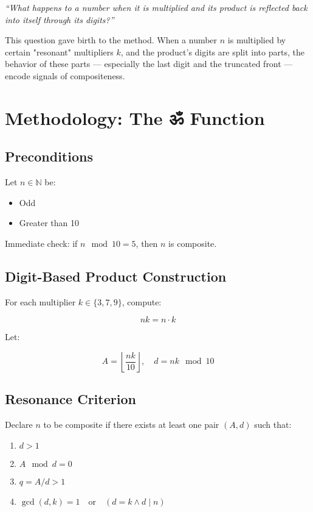 \documentclass{article}
\begin{document}
\textit{“What happens to a number when it is multiplied and its product is reflected back into itself through its digits?”}

This question gave birth to the method. When a number \( n \) is multiplied by certain "resonant" multipliers \( k \), and the product's digits are split into parts, the behavior of these parts — especially the last digit and the truncated front — encode signals of compositeness.

\section{Methodology: The ॐ Function}

\subsection{Preconditions}
Let \( n \in \mathbb{N} \) be:
\begin{itemize}
    \item Odd
    \item Greater than 10
\end{itemize}
Immediate check: if \( n \mod 10 = 5 \), then \( n \) is composite.

\subsection{Digit-Based Product Construction}
For each multiplier \( k \in \{3, 7, 9\} \), compute:

\[
nk = n \cdot k
\]

Let:

\[
A = \left\lfloor \frac{nk}{10} \right\rfloor, \quad d = nk \mod 10
\]

\subsection{Resonance Criterion}
Declare \( n \) to be composite if there exists at least one pair \( (A, d) \) such that:

\begin{enumerate}
    \item \( d > 1 \)
    \item \( A \mod d = 0 \)
    \item \( q = A / d > 1 \)
    \item \( \gcd(d, k) = 1 \quad \text{or} \quad (d = k \land d \mid n) \)
\end{enumerate}
\end{document}
